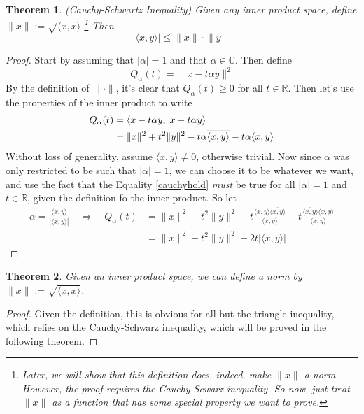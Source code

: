 \documentclass[12pt]{article}
\theoremstyle{plain}
\newtheorem{thm}{Theorem}[subsection]
\theoremstyle{definition}
\theoremstyle{remark}
\begin{document}
\begin{thm}
\label{thm.cauchyscwarz}
\emph{(Cauchy-Schwartz Inequality)}
Given any inner product space, define $\lVert x\rVert := \sqrt{\langle x,x\rangle}$.\footnote{Later, we will show that this definition does, indeed, make $\lVert x\rVert$ a norm.  However, the proof requires the Cauchy-Scwarz inequality. So now, just treat $\lVert x\rVert$ as a function that has some special property we want to prove.} Then
\[
    \lvert \langle x,y\rangle\rvert \leq \lVert x\rVert\cdot\lVert y\rVert
\]
\end{thm}
\begin{proof}
Start by assuming that $|\alpha|=1$ and that $\alpha\in\mathbb{C}$. Then define
\[
    Q_\alpha(t) = \lVert x - t\alpha y\rVert^2
\]
By the definition of $\lVert \cdot\rVert$, it's clear that $Q_\alpha(t)\geq 0$ for all $t\in\mathbb{R}$. Then let's use the properties of the inner product to write
\begin{align}
    Q_\alpha(t) &= \langle x -t\alpha y,\; x -t\alpha y\rangle \notag \\
    &= \lVert x\rVert^2 + t^2 \lVert y\rVert^2 
    - t\alpha \overline{\langle x,y\rangle}
    - t\bar{\alpha} {\langle x,y\rangle} \label{cauchyhold}
\end{align}
Without loss of generality, assume $\langle x,y\rangle\neq 0$, otherwise trivial. Now since $\alpha$ was only restricted to be such that $|\alpha|=1$, we can choose it to be whatever we want, and use the fact that the Equality \ref{cauchyhold} \emph{must} be true for all $|\alpha|=1$ and $t\in\mathbb{R}$, given the definition fo the inner product. So let
\begin{align*}
    \alpha = \frac{\langle x,y\rangle}{|\langle x,y\rangle|} 
    \quad\Rightarrow\quad
    Q_\alpha(t) &= \lVert x\rVert^2 + t^2 \lVert y\rVert^2 
    - t\frac{\langle x,y\rangle\overline{\langle x,y\rangle}}{\langle x,y\rangle} 
    - t\frac{\overline{\langle x,y\rangle}{\langle x,y\rangle}}{\langle x,y\rangle}  \\
    &= \lVert x\rVert^2 + t^2 \lVert y\rVert^2 
    -2t |\langle x,y\rangle|
\end{align*}
\end{proof}

\begin{thm}
\label{norminduce}
Given an inner product space, we can define a norm by $\lVert x\rVert := \sqrt{\langle x,x\rangle}$.
\end{thm}
\begin{proof}
Given the definition, this is obvious for all but the triangle inequality, which relies on the Cauchy-Schwarz inequality, which will be proved in the following theorem.
\end{proof}
\end{document}
